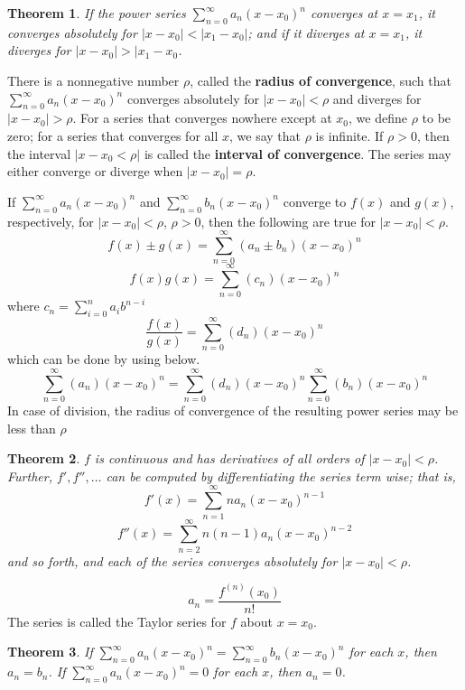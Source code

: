 \documentclass[letter]{article}
\newtheorem{theorem}{Theorem}[section]
\newenvironment{definition}[1][Definition]{\begin{trivlist}
\item[\hskip \labelsep {\bfseries #1}]}{\end{trivlist}}
\begin{document}
\begin{theorem}
If the power series  $\sum_{n=0}^{\infty} a_n(x-x_0)^n$ converges at $x = x_1$, it converges absolutely for $|x-x_0| < |x_1 - x_0|$; and if it diverges at $x=x_1$, it diverges for $|x-x_0| > |x_1-x_0$.
\end{theorem}

\begin{definition}
There is a nonnegative number $\rho$, called the \textbf{radius of convergence}, such that  $\sum_{n=0}^{\infty} a_n(x-x_0)^n$ converges absolutely for $|x-x_0|<\rho$ and diverges for $|x-x_0|>\rho$. For a series that converges nowhere except at $x_0$, we define $\rho$ to be zero; for a series that converges for all $x$, we say that $\rho$ is infinite. If $\rho>0$, then the interval $|x-x_0<\rho|$ is called the \textbf{interval of convergence}. The series may either converge or diverge when $|x-x_0| = \rho$.
\end{definition}

If  $\sum_{n=0}^{\infty} a_n(x-x_0)^n$ and  $\sum_{n=0}^{\infty} b_n(x-x_0)^n$ converge to $f(x)$ and $g(x)$, respectively, for $|x-x_0|<\rho$, $\rho>0$, then the following are true for $|x-x_0|<\rho$.
\[
f(x) \pm g(x) = \sum_{n=0}^{\infty} (a_n\pm b_n)(x-x_0)^n
\]
\[
f(x)g(x) = \sum_{n=0}^{\infty} (c_n)(x-x_0)^n
\]
where $c_n = \sum_{i=0}^n a_i b^{n-i}$
\[
\frac{f(x)}{g(x)} = \sum_{n=0}^{\infty} (d_n)(x-x_0)^n
\]
which can be done by using below.
\[
\sum_{n=0}^{\infty} (a_n)(x-x_0)^n = \sum_{n=0}^{\infty} (d_n)(x-x_0)^n\sum_{n=0}^{\infty} (b_n)(x-x_0)^n
\]
In case of division, the radius of convergence of the resulting power series may be less than $\rho$

\begin{theorem}
$f$ is continuous and has derivatives of all orders of $|x-x_0|<\rho$. Further, $f',f'',\ldots$ can be computed by differentiating the series term wise; that is,
\[f'(x) = \sum_{n=1}^\infty n a_n (x-x_0)^{n-1}\]
\[f''(x) = \sum_{n=2}^\infty n(n-1) a_n (x-x_0)^{n-2}\]
and so forth, and each of the series converges absolutely for $|x-x_0|<\rho$.
\end{theorem}

\begin{definition}
\[ a_n = \frac{f^{(n)}(x_0)}{n!} \]
The series is called the Taylor series for $f$ about $x=x_0$.
\end{definition}

\begin{theorem}
If $\sum_{n=0}^\infty a_n(x-x_0)^n = \sum_{n=0}^\infty b_n(x-x_0)^n$ for each $x$, then $a_n = b_n$. If $\sum_{n=0}^\infty a_n(x-x_0)^n = 0$ for each $x$, then $a_n = 0$.
\end{theorem}
\end{document}
